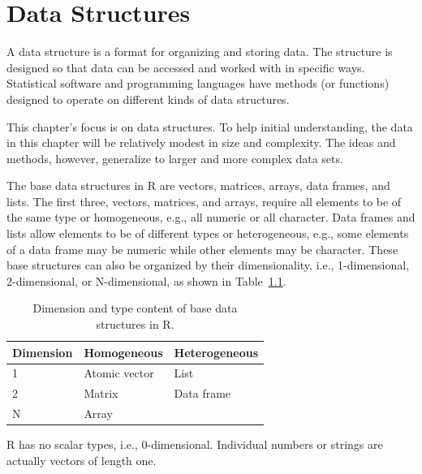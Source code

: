 \documentclass[12pt,oneside]{book}\usepackage[]{graphicx}\usepackage[]{color}
\begin{document}
\chapter{Data Structures}\label{SEC:STRUCTURES}

A data structure is a format for organizing and storing data. The structure is designed so that data can be accessed and worked with in specific ways. Statistical software and programming languages have methods (or functions) designed to operate on different kinds of data structures.

This chapter's focus is on data structures. To help initial understanding, the data in this chapter will be relatively modest in size and complexity. The ideas and methods, however, generalize to larger and more complex data sets.

The base data structures in R are vectors, matrices, arrays, data frames, and lists. The first three, vectors, matrices, and arrays, require all elements to be of the same type or homogeneous, e.g., all numeric or all character. Data frames and lists allow elements to be of different types or heterogeneous, e.g., some elements of a data frame may be numeric while other elements may be character. These base structures can also be organized by their dimensionality, i.e., 1-dimensional, 2-dimensional, or N-dimensional, as shown in Table~\ref{tab:dataStructures}.

\begin{table}[!ht]
\centering
\begin{tabular}{lll}
\hline
Dimension & Homogeneous &Heterogeneous \\ \hline
1 & Atomic vector & List \\
2 & Matrix & Data frame \\
N & Array &  \\ \hline
\end{tabular}
\caption{Dimension and type content of base data structures in R.}\label{tab:dataStructures}
\end{table}

R has no scalar types, i.e., 0-dimensional. Individual numbers or strings are actually vectors of length one.
\end{document}
